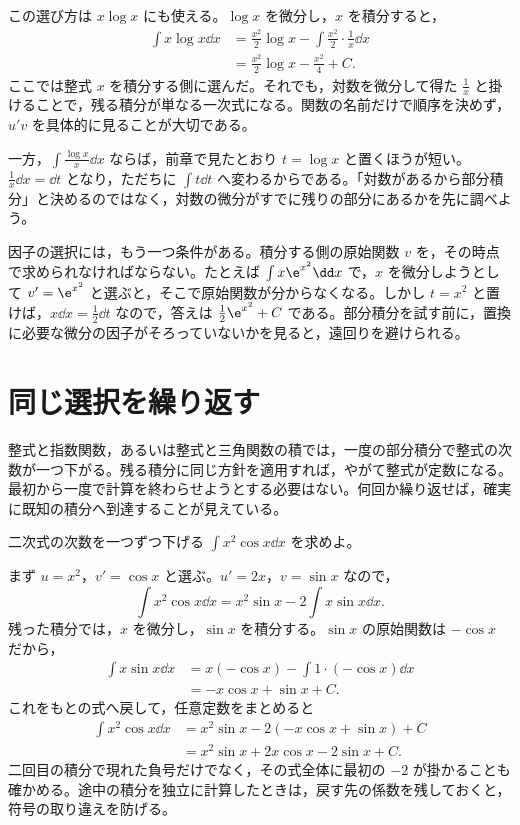 この選び方は $x\log x$ にも使える。$\log x$ を微分し，$x$ を積分すると，
\[
\begin{aligned}
 \int x\log x\dd x
 &=\frac{x^2}{2}\log x
   -\int\frac{x^2}{2}\cdot\frac1x\dd x\\
 &=\frac{x^2}{2}\log x-\frac{x^2}{4}+C.
\end{aligned}
\]
ここでは整式 $x$ を積分する側に選んだ。それでも，対数を微分して得た $\frac1x$ と掛けることで，残る積分が単なる一次式になる。関数の名前だけで順序を決めず，$u'v$ を具体的に見ることが大切である。

一方，$\int\frac{\log x}{x}\dd x$ ならば，前章で見たとおり $t=\log x$ と置くほうが短い。$\frac1x\dd x=\dd t$ となり，ただちに $\int t\dd t$ へ変わるからである。「対数があるから部分積分」と決めるのではなく，対数の微分がすでに残りの部分にあるかを先に調べよう。

因子の選択には，もう一つ条件がある。積分する側の原始関数 $v$ を，その時点で求められなければならない。たとえば $\int x\e^{x^2}\dd x$ で，$x$ を微分しようとして $v'=\e^{x^2}$ と選ぶと，そこで原始関数が分からなくなる。しかし $t=x^2$ と置けば，$x\dd x=\frac12\dd t$ なので，答えは $\frac12\e^{x^2}+C$ である。部分積分を試す前に，置換に必要な微分の因子がそろっていないかを見ると，遠回りを避けられる。

\section{同じ選択を繰り返す}\label{節:部分積分の反復}

整式と指数関数，あるいは整式と三角関数の積では，一度の部分積分で整式の次数が一つ下がる。残る積分に同じ方針を適用すれば，やがて整式が定数になる。最初から一度で計算を終わらせようとする必要はない。何回か繰り返せば，確実に既知の積分へ到達することが見えている。

\begin{example}{二次式の次数を一つずつ下げる}
$\int x^2\cos x\dd x$ を求めよ。
\end{example}

まず $u=x^2$，$v'=\cos x$ と選ぶ。$u'=2x$，$v=\sin x$ なので，
\[
 \int x^2\cos x\dd x
 =x^2\sin x-2\int x\sin x\dd x.
\]
残った積分では，$x$ を微分し，$\sin x$ を積分する。$\sin x$ の原始関数は $-\cos x$ だから，
\[
\begin{aligned}
 \int x\sin x\dd x
 &=x(-\cos x)-\int1\cdot(-\cos x)\dd x\\
 &=-x\cos x+\sin x+C.
\end{aligned}
\]
これをもとの式へ戻して，任意定数をまとめると
\[
\begin{aligned}
 \int x^2\cos x\dd x
 &=x^2\sin x-2(-x\cos x+\sin x)+C\\
 &=x^2\sin x+2x\cos x-2\sin x+C.
\end{aligned}
\]
二回目の積分で現れた負号だけでなく，その式全体に最初の $-2$ が掛かることも確かめる。途中の積分を独立に計算したときは，戻す先の係数を残しておくと，符号の取り違えを防げる。


